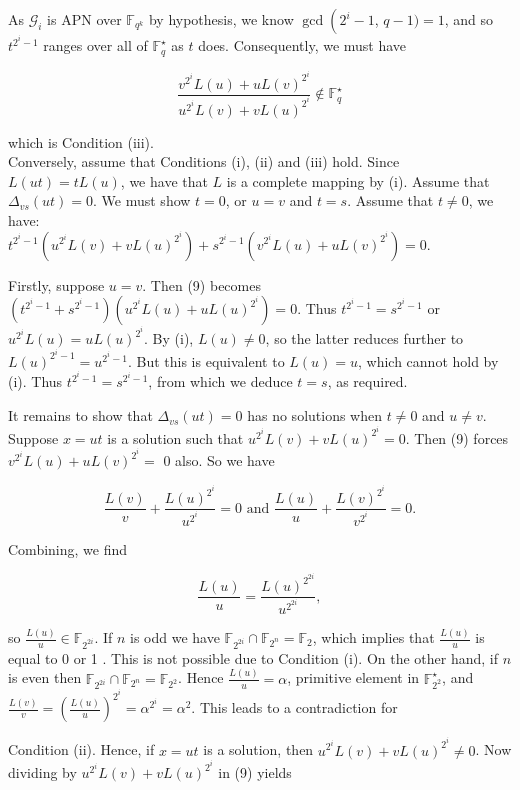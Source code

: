 \documentclass[10pt]{article}
\begin{document}
As $\mathcal{G}_{i}$ is APN over $\mathbb{F}_{q^{k}}$ by hypothesis, we know $\operatorname{gcd}\left(2^{i}-1\right.$, $q-1)=1$, and so $t^{2^{i}-1}$ ranges over all of $\mathbb{F}_{q}^{\star}$ as $t$ does. Consequently, we must have

$$
\frac{v^{2^{i}} L(u)+u L(v)^{2^{i}}}{u^{2^{i}} L(v)+v L(u)^{2^{i}}} \notin \mathbb{F}_{q}^{\star}
$$

which is Condition (iii).\\
Conversely, assume that Conditions (i), (ii) and (iii) hold. Since $L(u t)=t L(u)$, we have that $L$ is a complete mapping by (i). Assume that $\Delta_{v s}(u t)=0$. We must show $t=0$, or $u=v$ and $t=s$. Assume that $t \neq 0$, we have:\\
$t^{2^{i}-1}\left(u^{2^{i}} L(v)+v L(u)^{2^{i}}\right)+s^{2^{i}-1}\left(v^{2^{i}} L(u)+u L(v)^{2^{i}}\right)=0$.

Firstly, suppose $u=v$. Then (9) becomes $\left(t^{2^{i}-1}+s^{2^{i}-1}\right)\left(u^{2^{i}} L(u)+u L(u)^{2^{i}}\right)=0$. Thus $t^{2^{i}-1}=s^{2^{i}-1}$ or $u^{2^{i}} L(u)=u L(u)^{2^{i}}$. By (i), $L(u) \neq 0$, so the latter reduces further to $L(u)^{2^{i}-1}=u^{2^{i}-1}$. But this is equivalent to $L(u)=u$, which cannot hold by (i). Thus $t^{2^{i}-1}=s^{2^{i}-1}$, from which we deduce $t=s$, as required.

It remains to show that $\Delta_{v s}(u t)=0$ has no solutions when $t \neq 0$ and $u \neq v$. Suppose $x=u t$ is a solution such that $u^{2^{i}} L(v)+v L(u)^{2^{i}}=0$. Then (9) forces $v^{2^{i}} L(u)+u L(v)^{2^{i}}=$ 0 also. So we have

$$
\frac{L(v)}{v}+\frac{L(u)^{2^{i}}}{u^{2^{i}}}=0 \text { and } \frac{L(u)}{u}+\frac{L(v)^{2^{i}}}{v^{2^{i}}}=0 .
$$

Combining, we find

$$
\frac{L(u)}{u}=\frac{L(u)^{2^{2 i}}}{u^{2^{2 i}}},
$$

so $\frac{L(u)}{u} \in \mathbb{F}_{2^{2 i}}$. If $n$ is odd we have $\mathbb{F}_{2^{2 i}} \cap \mathbb{F}_{2^{n}}=\mathbb{F}_{2}$, which implies that $\frac{L(u)}{u}$ is equal to 0 or 1 . This is not possible due to Condition (i). On the other hand, if $n$ is even then $\mathbb{F}_{2^{2 i}} \cap \mathbb{F}_{2^{n}}=\mathbb{F}_{2^{2}}$. Hence $\frac{L(u)}{u}=\alpha$, primitive element in $\mathbb{F}_{2^{2}}^{\star}$, and $\frac{L(v)}{v}=\left(\frac{L(u)}{u}\right)^{2^{i}}=\alpha^{2^{i}}=\alpha^{2}$. This leads to a contradiction for

Condition (ii). Hence, if $x=u t$ is a solution, then $u^{2^{i}} L(v)+ v L(u)^{2^{i}} \neq 0$. Now dividing by $u^{2^{i}} L(v)+v L(u)^{2^{i}}$ in (9) yields
\end{document}
